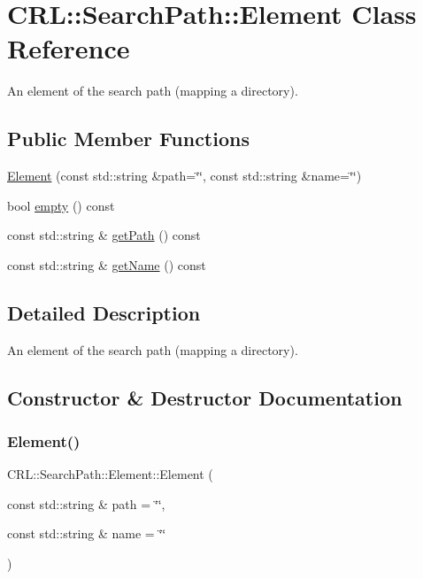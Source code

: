 \hypertarget{classCRL_1_1SearchPath_1_1Element}{}\section{C\+RL\+:\+:Search\+Path\+:\+:Element Class Reference}
\label{classCRL_1_1SearchPath_1_1Element}


An element of the search path (mapping a directory).  


\subsection*{Public Member Functions}
\begin{DoxyCompactItemize}
\item 
\hyperlink{classCRL_1_1SearchPath_1_1Element_a285f27a24b1bdc986bd0316794863e45}{Element} (const std\+::string \&path=\char`\"{}\char`\"{}, const std\+::string \&name=\char`\"{}\char`\"{})
\item 
bool \hyperlink{classCRL_1_1SearchPath_1_1Element_ab2ab7a961f0b9fa791f266c8ee63b494}{empty} () const
\item 
const std\+::string \& \hyperlink{classCRL_1_1SearchPath_1_1Element_a91f3e1af2b687e2afe4369ba5882ac89}{get\+Path} () const
\item 
const std\+::string \& \hyperlink{classCRL_1_1SearchPath_1_1Element_a58e738bdc59bd7d5344e9271427b0869}{get\+Name} () const
\end{DoxyCompactItemize}


\subsection{Detailed Description}
An element of the search path (mapping a directory). 

\subsection{Constructor \& Destructor Documentation}
\mbox{\label{classCRL_1_1SearchPath_1_1Element_a285f27a24b1bdc986bd0316794863e45}} 
\subsubsection{\texorpdfstring{Element()}{Element()}}
{\footnotesize\ttfamily C\+R\+L\+::\+Search\+Path\+::\+Element\+::\+Element (\begin{DoxyParamCaption}\item[{const std\+::string \&}]{path = {\ttfamily \char`\"{}\char`\"{}},  }\item[{const std\+::string \&}]{name = {\ttfamily \char`\"{}\char`\"{}} }\end{DoxyParamCaption})\hspace{0.3cm}{\ttfamily [inline]}}

